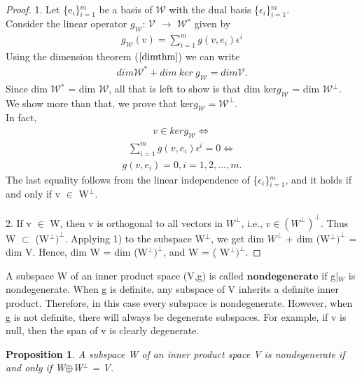 \documentclass[12pt,a4paper]{article}
\newtheorem{prop}{Proposition}
\begin{document}
\begin{proof}
1. Let \{e$_i$\}$^m_{i=1}$  be a basis of $\mathcal{W}$ with the dual basis \{$\epsilon$$_i$\}$^m_{i=1}$. \\Consider the linear operator $g_\mathcal{W}$: $\mathcal{V}$ $\to$ $\mathcal{W}$$^*$ given by
\begin{align*}
g_\mathcal{W}(v) = \sum_{i=1}^{m} g(v, e_i)\epsilon^i
\end{align*}
 Using the dimension theorem ($\ref{dimthm}$) we can write
 \begin{align*}
dim \mathcal{W}^* + dim \ ker \ g_\mathcal{W} = dim \mathcal{V}.
\end{align*}
Since dim $\mathcal{W}$$^*$ = dim $\mathcal{W}$, all that is left to show is that dim ker$g_\mathcal{W}$ = dim $\mathcal{W}$$^\perp$. \\We show more than that, we prove that ker$g_\mathcal{W} = \mathcal{W}^\perp$. \\In fact,\\
\begin{align*}
v \in ker g_\mathcal{W} \Leftrightarrow
\end{align*}
\begin{align*}
 \sum^m_{i=1} g(v, e_i) \epsilon^i = 0 \Leftrightarrow
 \end{align*}
\begin{align*}
g(v, e_i) = 0, i = 1, 2, ... , m.
\end{align*}
The last equality follows from the linear independence of  \{$\epsilon$$_i$\}$^m_{i=1}$, and it holds if and only if v $\in$ W$^\perp$.\\\\
2. If v $\in$ W, then v is orthogonal to all vectors in $W^\perp$, i.e., $v \in (W^\perp)^\perp$. Thus W $\subset$ (W$^\perp)^\perp$. Applying 1) to the subspace
W$^\perp$, we get dim $W^\perp$ + dim (W$^\perp)^\perp$ = dim V. Hence, dim W = dim (W$^\perp)^\perp$, and W = ( W$^\perp)^\perp$.
\end{proof}
A subspace W of an inner product space (V,g) is called $\textbf{nondegenerate}$ if g|$_W$ is nondegenerate. When g is definite, any subspace of V inherits
a definite inner product. Therefore, in this case every subspace is nondegenerate. However, when g is not definite, there will always be degenerate
subspaces. For example, if v is null, then the span of v is clearly degenerate.

\begin{prop}
A subspace W of an inner product space V is nondegenerate if and only if W$\oplus$W$^\perp$ = V.
\end{prop}
\end{document}
